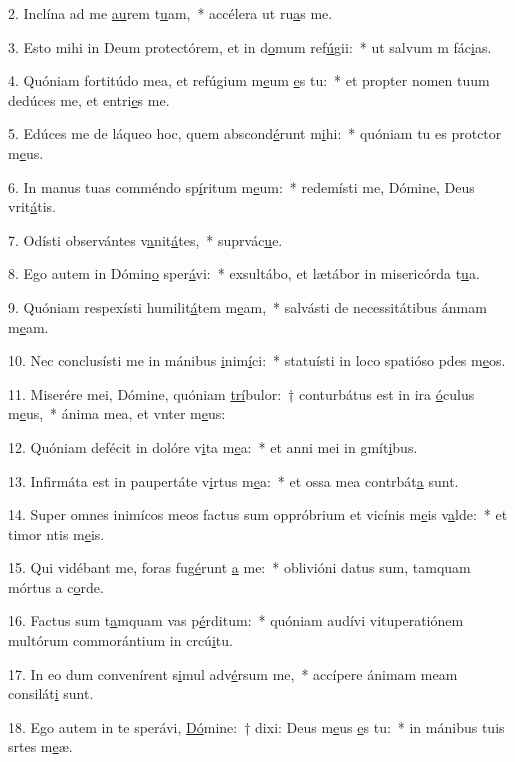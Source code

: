2. Inclína ad me \uline{au}rem t\uline{u}am,~* accélera ut ru\uline{a}s me.\par 
3. Esto mihi in Deum protectórem, et in d\uline{o}mum ref\uline{ú}gii:~* ut salvum m fác\uline{i}as.\par 
4. Quóniam fortitúdo mea, et refúgium m\uline{e}um \uline{e}s tu:~* et propter nomen tuum dedúces me, et entri\uline{e}s me.\par 
5. Edúces me de láqueo hoc, quem abscond\uline{é}runt m\uline{i}hi:~* quóniam tu es protctor m\uline{e}us.\par 
6. In manus tuas comméndo sp\uline{í}ritum m\uline{e}um:~* redemísti me, Dómine, Deus vrit\uline{á}tis.\par 
7. Odísti observántes v\uline{a}nit\uline{á}tes,~* suprvác\uline{u}e.\par 
8. Ego autem in Dómin\uline{o} sper\uline{á}vi:~* exsultábo, et lætábor in misericórda t\uline{u}a.\par 
9. Quóniam respexísti humilit\uline{á}tem m\uline{e}am,~* salvásti de necessitátibus ánmam m\uline{e}am.\par 
10. Nec conclusísti me in mánibus \uline{i}nim\uline{í}ci:~* statuísti in loco spatióso pdes m\uline{e}os.\par 
11. Miserére mei, Dómine, quóniam \uline{trí}bulor:~† conturbátus est in ira \uline{ó}culus m\uline{e}us,~* ánima mea, et vnter m\uline{e}us:\par 
12. Quóniam defécit in dolóre v\uline{i}ta m\uline{e}a:~* et anni mei in gmít\uline{i}bus.\par 
13. Infirmáta est in paupertáte v\uline{i}rtus m\uline{e}a:~* et ossa mea contrbát\uline{a} sunt.\par 
14. Super omnes inimícos meos factus sum oppróbrium et vicínis m\uline{e}is v\uline{a}lde:~* et timor ntis m\uline{e}is.\par 
15. Qui vidébant me, foras fug\uline{é}runt \uline{a} me:~* oblivióni datus sum, tamquam mórtus a c\uline{o}rde.\par 
16. Factus sum t\uline{a}mquam vas p\uline{é}rditum:~* quóniam audívi vituperatiónem multórum commorántium in crcú\uline{i}tu.\par 
17. In eo dum convenírent s\uline{i}mul adv\uline{é}rsum me,~* accípere ánimam meam consilát\uline{i} sunt.\par 
18. Ego autem in te sperávi, \uline{Dó}mine:~† dixi: Deus m\uline{e}us \uline{e}s tu:~* in mánibus tuis srtes m\uline{e}æ.\par 
